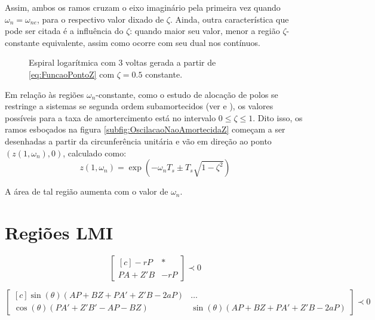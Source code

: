Assim, ambos os ramos cruzam o eixo imaginário pela primeira vez quando $\omega_n = \omega_{ne}$, para o respectivo valor dixado de $\zeta$. Ainda, outra característica que pode ser citada é a influência do $\zeta$: quando maior seu valor, menor a região $\zeta$-constante equivalente, assim como ocorre com seu dual nos contínuos.

\begin{figure}[!h]
  \centering
  
  \caption{Espiral logarítmica com 3 voltas gerada a partir de \eqref{eq:FuncaoPontoZ} com $\zeta=0.5$ constante.}
  \label{fig:EspiralLogaritmica}
\end{figure}

Em relação às regiões $\omega_n$-constante, como o estudo de alocação de polos se restringe a sistemas se segunda ordem subamortecidos (ver \cite{NISE2011} e \cite{OGATA2011}), os valores possíveis para a taxa de amortercimento está no intervalo $0 \leq \zeta \leq 1$. Dito isso, os ramos esboçados na figura \ref{subfig:OscilacaoNaoAmortecidaZ} começam a ser desenhadas a partir da circunferência unitária e vão em direção ao ponto $(z(1,\omega_n),0)$, calculado como:
\begin{equation}
  z(1,\omega_n) = \exp{\left(-\omega_nT_s \pm T_s\sqrt{1-\zeta^2}\right)}\label{eq:PontoExtremoWnZ}
\end{equation}

A área de tal região aumenta com o valor de $\omega_n$.

\section{Regiões LMI}

\begin{equation}
  \begin{bmatrix*}[c]
    -rP       & * \\
    PA + Z'B  & -rP
  \end{bmatrix*}
  \prec 0\label{eq:LMIEstabilidadeRelativa}
\end{equation}

\begin{equation}
  \begin{bmatrix*}[c]
    \sin{(\theta)(AP + BZ + PA' + Z'B -2aP)} &  \dots \\
    \cos{(\theta)(PA' + Z'B'- AP - BZ)}      &  \sin{(\theta)(AP + BZ + PA' + Z'B -2aP)}
  \end{bmatrix*}
  \prec 0\label{eq:LMIESetorConicoEsquerdo}
\end{equation}

